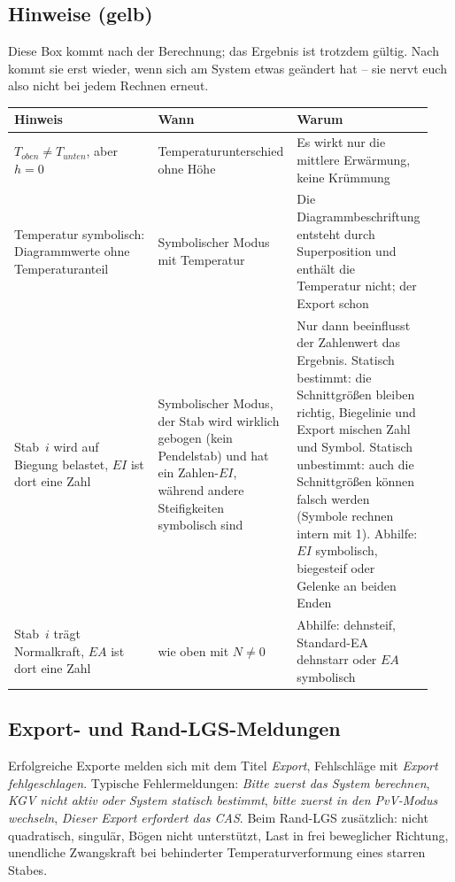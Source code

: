 \subsection{Hinweise (gelb)}\label{sec:hinweise}

Diese Box kommt nach der Berechnung; das Ergebnis ist trotzdem gültig. Nach  kommt sie
erst wieder, wenn sich am System etwas geändert hat -- sie nervt euch also nicht bei jedem
Rechnen erneut.

\begin{longtable}{p{0.34\linewidth}p{0.29\linewidth}p{0.31\linewidth}}
  \toprule
  \textbf{Hinweis} & \textbf{Wann} & \textbf{Warum} \\
  \midrule \endhead
  $T_{oben} \ne T_{unten}$, aber $h = 0$ & Temperaturunterschied ohne Höhe &
    Es wirkt nur die mittlere Erwärmung, keine Krümmung \\
  Temperatur symbolisch: Diagrammwerte ohne Temperaturanteil & Symbolischer Modus mit Temperatur &
    Die Diagrammbeschriftung entsteht durch Superposition und enthält die Temperatur nicht; der
    Export schon \\
  Stab~$i$ wird auf Biegung belastet, $EI$ ist dort eine Zahl & Symbolischer Modus, der Stab wird
    wirklich gebogen (kein Pendelstab) und hat ein Zahlen-$EI$, während andere Steifigkeiten
    symbolisch sind & Nur dann beeinflusst der Zahlenwert das Ergebnis. Statisch bestimmt: die
    Schnittgrößen bleiben richtig, Biegelinie und Export mischen Zahl und Symbol. Statisch
    unbestimmt: auch die Schnittgrößen können falsch werden (Symbole rechnen intern mit 1).
    Abhilfe: $EI$ symbolisch, biegesteif oder Gelenke an beiden Enden \\
  Stab~$i$ trägt Normalkraft, $EA$ ist dort eine Zahl & wie oben mit $N \ne 0$ & Abhilfe:
    dehnsteif, Standard-EA dehnstarr oder $EA$ symbolisch \\
  \bottomrule
\end{longtable}

\subsection{Export- und Rand-LGS-Meldungen}

Erfolgreiche Exporte melden sich mit dem Titel \emph{Export}, Fehlschläge mit \emph{Export
fehlgeschlagen}. Typische Fehlermeldungen: \emph{Bitte zuerst das System berechnen}, \emph{KGV
nicht aktiv oder System statisch bestimmt}, \emph{bitte zuerst in den PvV-Modus wechseln},
\emph{Dieser Export erfordert das CAS}. Beim Rand-LGS zusätzlich: nicht quadratisch, singulär,
Bögen nicht unterstützt, Last in frei beweglicher Richtung, unendliche Zwangskraft bei
behinderter Temperaturverformung eines starren Stabes.

